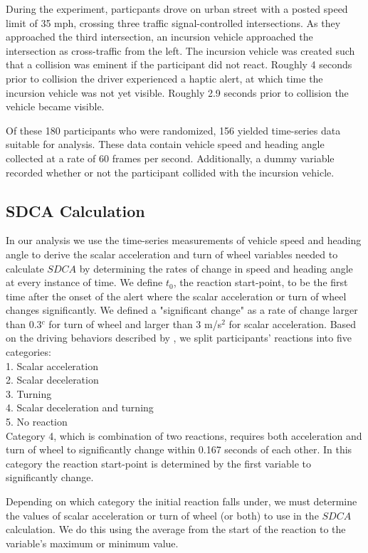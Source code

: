 \documentclass{article}
\begin{document}
During the experiment, particpants drove on urban street with a posted speed limit of 35 mph, crossing three traffic signal-controlled intersections.  As they approached the third intersection, an incursion vehicle approached the intersection as cross-traffic from the left.  The incursion vehicle was created such that a collision was eminent if the participant did not react.  Roughly 4 seconds prior to collision the driver experienced a haptic alert, at which time the incursion vehicle was not yet visible.  Roughly 2.9 seconds prior to collision the vehicle became visible. 

Of these 180 participants who were randomized, 156 yielded time-series data suitable for analysis.  These data contain vehicle speed and heading angle collected at a rate of 60 frames per second. Additionally, a dummy variable recorded whether or not the participant collided with the incursion vehicle.

\subsection{SDCA Calculation}

In our analysis we use the time-series measurements of vehicle speed and heading angle to derive the scalar acceleration and turn of wheel variables needed to calculate $SDCA$ by determining the rates of change in speed and heading angle at every instance of time. We define $t_0$, the reaction start-point, to be the first time after the onset of the alert where the scalar acceleration or turn of wheel changes significantly. We defined a "significant change" as a rate of change larger than 0.3$^c$ for turn of wheel and larger than 3 m/s$^2$ for scalar acceleration. Based on the driving behaviors described by \cite{Hyden}, we split participants' reactions into five categories:\\
1. Scalar acceleration\\
2. Scalar deceleration\\
3. Turning\\
4. Scalar deceleration and turning\\
5. No reaction\\ 

Category 4, which is combination of two reactions, requires both acceleration and turn of wheel to significantly change within 0.167 seconds of each other. In this category the reaction start-point is determined by the first variable to significantly change.

Depending on which category the initial reaction falls under, we must determine the values of scalar acceleration or turn of wheel (or both) to use in the $SDCA$ calculation.  We do this using the average from the start of the reaction to the variable's maximum or minimum value.
\end{document}
